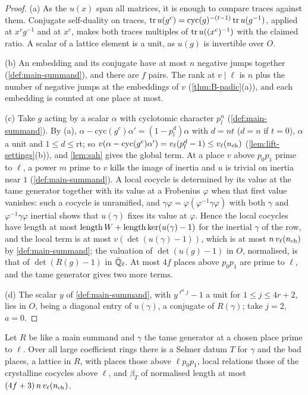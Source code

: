 \begin{proof}
(a) As the $u(x)$ span all matrices, it is enough to compare traces against them. Conjugate self-duality on traces, $\operatorname{tr} u(g^c)=\mathrm{cyc}(g)^{-(t-1)}\operatorname{tr} u(g^{-1})$, applied at $x^cg^{-1}$ and at $x^c$, makes both traces multiples of $\operatorname{tr} u((x^c)^{-1})$ with the claimed ratio. A scalar of a lattice element is a unit, as $u(g)$ is invertible over $O$.

(b) An embedding and its conjugate have at most $n$ negative jumps together (\cref{def:main-summand}), and there are $f$ pairs. The rank at $v\mid\ell$ is $n$ plus the number of negative jumps at the embeddings of $v$ (\cref{thm:B-padic}(a)), and each embedding is counted at one place at most.

(c) Take $g$ acting by a scalar $\alpha$ with cyclotomic character $p_l^n$ (\cref{def:main-summand}). By (a), $\alpha-\mathrm{cyc}(g^c)\alpha'=(1-p_l^d)\alpha$ with $d=nt$ ($d=n$ if $t=0$), $\alpha$ a unit and $1\le d\le\mathrm r\mathrm t$; so $v(\alpha-\mathrm{cyc}(g^c)\alpha')=v_\ell(p_l^d-1)\le v_\ell(n_{\rm ch})$ (\cref{lem:lift-settings}(b)), and
\cref{lem:sah} gives the global term. At a place $v$ above $p_0p_1$ prime to $\ell$, a power $m$ prime to $v$ kills the image of inertia and $u$ is trivial on inertia near $1$ (\cref{def:main-summand}). A local cocycle is determined by its value at the tame generator together with its value at a Frobenius $\varphi$ when that first value vanishes: such a cocycle is
unramified, and $\gamma\varphi=\varphi(\varphi^{-1}\gamma\varphi)$ with both $\gamma$ and $\varphi^{-1}\gamma\varphi$ inertial shows that $u(\gamma)$ fixes its value at $\varphi$. Hence the local cocycles have length at most $\operatorname{length} W+\operatorname{length}\ker(u(\gamma)-1)$ for the inertial $\gamma$ of the row, and the local term is at most
$v(\det(u(\gamma)-1))$, which is at most $n\,v_\ell(n_{\rm ch})$ by \cref{def:main-summand}; the valuation of $\det(u(g)-1)$ in $O$, normalised, is that of $\det(R(g)-1)$ in $\bar{\mathbb{Q}}_\ell$. At most $4f$ places above $p_0p_1$ are prime to $\ell$, and the tame generator gives two more terms.

(d) The scalar $y$ of \cref{def:main-summand}, with $y^{\ell^aj}-1$ a unit for $1\le j\le4r+2$, lies in $O$, being a diagonal entry of $u(\gamma)$, a conjugate of $R(\gamma)$; take $j=2$, $a=0$.
\end{proof}

\begin{proposition}\label{prop:main-summand-data}
Let $R$ be like a main summand and $\gamma$ the tame generator at a chosen place prime to $\ell$. Over all large coefficient rings there is a Selmer datum $T$ for $\gamma$ and the bad places, a lattice in $R$, with places those above
$\ell p_0p_1$, local relations those of the crystalline cocycles above $\ell$, and $\beta_T$ of normalised length at most $(4f+3)\,n\,v_\ell(n_{\rm ch})$.
\end{proposition}

